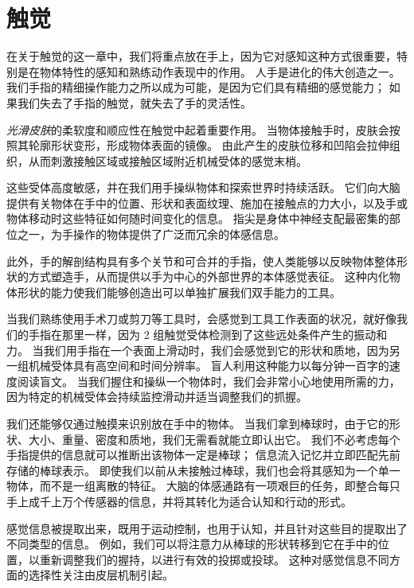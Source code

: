 \chapter{触觉} \label{chap:chap19}

在关于触觉的这一章中，我们将重点放在手上，因为它对感知这种方式很重要，特别是在物体特性的感知和熟练动作表现中的作用。
人手是进化的伟大创造之一。
我们手指的精细操作能力之所以成为可能，是因为它们具有精细的感觉能力；
如果我们失去了手指的触觉，就失去了手的灵活性。



\textit{光滑皮肤}的柔软度和顺应性在触觉中起着重要作用。
当物体接触手时，皮肤会按照其轮廓形状变形，形成物体表面的镜像。
由此产生的皮肤位移和凹陷会拉伸组织，从而刺激接触区域或接触区域附近机械受体的感觉末梢。



这些受体高度敏感，并在我们用手操纵物体和探索世界时持续活跃。
它们向大脑提供有关物体在手中的位置、形状和表面纹理、施加在接触点的力大小，以及手或物体移动时这些特征如何随时间变化的信息。
指尖是身体中神经支配最密集的部位之一，为手操作的物体提供了广泛而冗余的体感信息。


此外，手的解剖结构具有多个关节和可合并的手指，使人类能够以反映物体整体形状的方式塑造手，从而提供以手为中心的外部世界的本体感觉表征。
这种内化物体形状的能力使我们能够创造出可以单独扩展我们双手能力的工具。


当我们熟练使用手术刀或剪刀等工具时，会感觉到工具工作表面的状况，就好像我们的手指在那里一样，因为 2 组触觉受体检测到了这些远处条件产生的振动和力。
当我们用手指在一个表面上滑动时，我们会感觉到它的形状和质地，因为另一组机械受体具有高空间和时间分辨率。
盲人利用这种能力以每分钟一百字的速度阅读盲文。
当我们握住和操纵一个物体时，我们会非常小心地使用所需的力，因为特定的机械受体会持续监控滑动并适当调整我们的抓握。


我们还能够仅通过触摸来识别放在手中的物体。
当我们拿到棒球时，由于它的形状、大小、重量、密度和质地，我们无需看就能立即认出它。
我们不必考虑每个手指提供的信息就可以推断出该物体一定是棒球；
信息流入记忆并立即匹配先前存储的棒球表示。
即使我们以前从未接触过棒球，我们也会将其感知为一个单一物体，而不是一组离散的特征。
大脑的体感通路有一项艰巨的任务，即整合每只手上成千上万个传感器的信息，并将其转化为适合认知和行动的形式。


感觉信息被提取出来，既用于运动控制，也用于认知，并且针对这些目的提取出了不同类型的信息。
例如，我们可以将注意力从棒球的形状转移到它在手中的位置，以重新调整我们的握持，以进行有效的投掷或投球。
这种对感觉信息不同方面的选择性关注由皮层机制引起。



